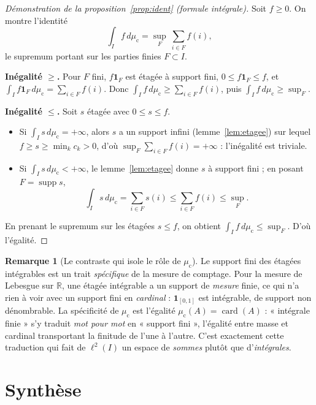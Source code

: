 \documentclass[11pt,a4paper]{article}
\theoremstyle{plain}
\theoremstyle{definition}
\newtheorem{remarque}[theoreme]{Remarque}
\newcommand{\R}{\mathbb{R}}
\newcommand{\card}{\operatorname{card}}
\newcommand{\supp}{\operatorname{supp}}
\newcommand{\muc}{\mu_{\mathrm{c}}}
\begin{document}
\begin{proof}[Démonstration de la proposition~\ref{prop:ident} (formule intégrale)]
Soit $f \ge 0$. On montre l'identité
\[
  \int_I f\, d\muc = \sup_{F}\ \sum_{i\in F} f(i),
\]
le supremum portant sur les parties finies $F \subset I$.

\medskip
\noindent\textbf{Inégalité $\ge$.} Pour $F$ fini, $f\mathbf{1}_F$ est étagée à
support fini, $0 \le f\mathbf{1}_F \le f$, et
$\int_I f\mathbf{1}_F\, d\muc = \sum_{i\in F} f(i)$. Donc
$\int_I f\, d\muc \ge \sum_{i\in F} f(i)$, puis $\int_I f\, d\muc \ge \sup_F$.

\medskip
\noindent\textbf{Inégalité $\le$.} Soit $s$ étagée avec $0 \le s \le f$.
\begin{itemize}[nosep,leftmargin=1.4em]
  \item Si $\int_I s\, d\muc = +\infty$, alors $s$ a un support infini
        (lemme~\ref{lem:etagee}) sur lequel $f \ge s \ge \min_k c_k > 0$, d'où
        $\sup_F \sum_{i\in F} f(i) = +\infty$ : l'inégalité est triviale.
  \item Si $\int_I s\, d\muc < +\infty$, le lemme~\ref{lem:etagee} donne
        $s$ à support fini ; en posant $F = \supp s$,
        \[
          \int_I s\, d\muc = \sum_{i \in F} s(i)
             \le \sum_{i\in F} f(i) \le \sup_F .
        \]
\end{itemize}
En prenant le supremum sur les étagées $s \le f$, on obtient
$\int_I f\, d\muc \le \sup_F$. D'où l'égalité.
\end{proof}

\begin{remarque}[Le contraste qui isole le rôle de $\muc$]
Le support fini des étagées intégrables est un trait \emph{spécifique} de la
mesure de comptage. Pour la mesure de Lebesgue sur $\R$, une étagée intégrable a
un support de \emph{mesure} finie, ce qui n'a rien à voir avec un support fini en
\emph{cardinal} : $\mathbf{1}_{[0,1]}$ est intégrable, de support non dénombrable.
La spécificité de $\muc$ est l'égalité $\muc(A) = \card(A)$ : « intégrale finie »
s'y traduit \emph{mot pour mot} en « support fini », l'égalité entre masse et
cardinal transportant la finitude de l'une à l'autre. C'est exactement cette
traduction qui fait de $\ell^2(I)$ un espace de \emph{sommes} plutôt que
d'\emph{intégrales}.
\end{remarque}

\section{Synthèse}
\end{document}
